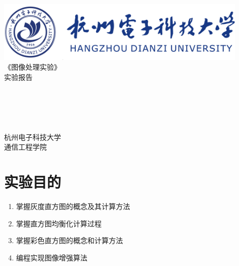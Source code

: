 \documentclass[a4paper]{ctexart}
\begin{document}
  \begin{titlepage}
      \songti
      \begin{center}
        \vspace*{1cm}
        \includegraphics[width=0.9\textwidth]{../HDU.png}\\
        \vspace*{2.5cm}
        {\fontsize{24pt}{0}
          《图像处理实验》\\
          \fontsize{36pt}{0}
          \vspace*{1cm}
          实验报告\\
        }
        \vspace*{3cm}
        {\fontsize{18pt}{0}
           \\
          \vspace*{2cm}
           \\
          \vspace*{0.5cm}
           \\
          \vspace*{0.5cm}
           \\
          \vspace*{0.5cm}
           \\
          \vspace*{5cm}
          杭州电子科技大学\\通信工程学院
        }
      \end{center}
  \end{titlepage}


  \newpage
  \section{实验目的}
  \begin{enumerate}
    \item 掌握灰度直方图的概念及其计算方法
    \item 掌握直方图均衡化计算过程
    \item 掌握彩色直方图的概念和计算方法
    \item 编程实现图像增强算法
  \end{enumerate}
\end{document}
